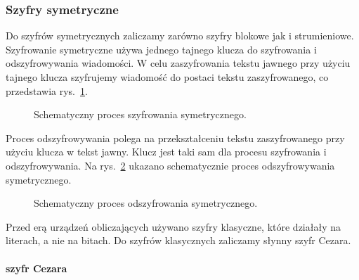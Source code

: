 \documentclass[12p]{article}
\begin{document}
\subsubsection{Szyfry symetryczne}
\quad Do szyfrów symetrycznych zaliczamy zarówno szyfry blokowe jak i strumieniowe. Szyfrowanie symetryczne używa jednego tajnego klucza do szyfrowania i odszyfrowywania wiadomości. W celu zaszyfrowania tekstu jawnego przy użyciu tajnego klucza szyfrujemy wiadomość do postaci tekstu zaszyfrowanego, co przedstawia rys.~\ref{szyfrowanie}.
\newline
\begin{figure}[!h]
\begin{center}
\end{center}
\caption{Schematyczny proces szyfrowania symetrycznego.}\label{szyfrowanie}
\end{figure}

Proces odszyfrowywania polega na przekształceniu tekstu zaszyfrowanego przy użyciu klucza w tekst jawny. Klucz jest taki sam dla procesu szyfrowania i odszyfrowywania. Na rys.~\ref{odszyfrowanie} ukazano schematycznie proces odszyfrowywania symetrycznego.
\newline
\begin{figure}[!h]
\begin{center}
\end{center}
\caption{Schematyczny proces odszyfrowania symetrycznego.}\label{odszyfrowanie}
\end{figure}

Przed erą urządzeń obliczających używano szyfry klasyczne, które działały na literach, a nie na bitach. Do szyfrów klasycznych zaliczamy słynny szyfr Cezara.
\paragraph{szyfr Cezara}
\quad 
\end{document}
